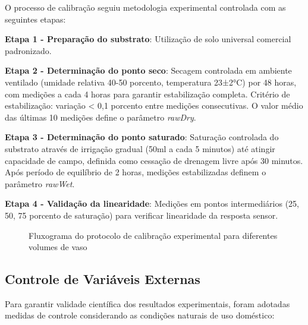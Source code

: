 O processo de calibração seguiu metodologia experimental controlada com as seguintes etapas:

\textbf{Etapa 1 - Preparação do substrato}: Utilização de solo universal comercial padronizado.

\textbf{Etapa 2 - Determinação do ponto seco}: Secagem controlada em ambiente ventilado (umidade relativa 40-50 porcento, temperatura 23±2°C) por 48 horas, com medições a cada 4 horas para garantir estabilização completa. Critério de estabilização: variação < 0,1 porcento entre medições consecutivas. O valor médio das últimas 10 medições define o parâmetro \textit{rawDry}.

\textbf{Etapa 3 - Determinação do ponto saturado}: Saturação controlada do substrato através de irrigação gradual (50ml a cada 5 minutos) até atingir capacidade de campo, definida como cessação de drenagem livre após 30 minutos. Após período de equilíbrio de 2 horas, medições estabilizadas definem o parâmetro \textit{rawWet}.

\textbf{Etapa 4 - Validação da linearidade}: Medições em pontos intermediários (25, 50, 75 porcento de saturação) para verificar linearidade da resposta sensor.

\begin{figure}[htbp]
\centering
\caption{Fluxograma do protocolo de calibração experimental para diferentes volumes de vaso}
\label{fig:protocolo_calibracao}
\end{figure}

\subsection{Controle de Variáveis Externas}

Para garantir validade científica dos resultados experimentais, foram adotadas medidas de controle considerando as condições naturais de uso doméstico:

